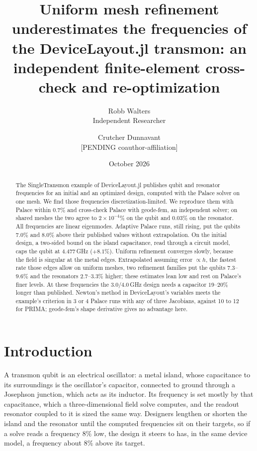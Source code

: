 \documentclass{anvil-paper}
\title{Uniform mesh refinement underestimates the frequencies of the
DeviceLayout.jl transmon: an independent finite-element cross-check and
re-optimization}
\author{Robb Walters\\
  {\normalsize Independent Researcher}
  \and Crutcher Dunnavant\\
  {\normalsize [PENDING coauthor-affiliation]}}
\date{October 2026}
\begin{document}
\maketitle

\begin{abstract}
The SingleTransmon example of DeviceLayout.jl publishes qubit and
resonator frequencies for an initial and an optimized design, computed
with the Palace solver on one mesh. We find those
frequencies discretization-limited. We reproduce them with Palace within
$0.7\%$ and cross-check Palace with geode-fem, an independent solver; on
shared meshes the two agree to $2\times10^{-4}\%$ on the qubit and
$0.03\%$ on the resonator. All frequencies are linear eigenmodes. Adaptive
Palace runs, still rising, put the qubits $7.0\%$ and $8.0\%$ above their
published values without extrapolation. On the initial design, a two-sided
bound on the island capacitance, read through a circuit model, caps the
qubit at $4.477$\,GHz ($+8.1\%$). Uniform refinement converges slowly, because the field is singular at the metal edges.
Extrapolated assuming error $\propto h$, the fastest rate those edges allow on uniform meshes, two refinement families put the qubits $7.3$--$9.6\%$ and the
resonators $2.7$--$3.3\%$ higher; these estimates lean low and rest on
Palace's finer levels. At these frequencies the $3.0$/$4.0$\,GHz
design needs a capacitor $19$--$20\%$ longer than published. Newton's
method in DeviceLayout's variables meets the example's criterion in 3 or
4 Palace runs with any of three Jacobians, against 10 to 12 for PRIMA;
geode-fem's shape derivative gives no advantage here.
\end{abstract}

\section{Introduction}
\label{sec:intro}

A transmon qubit is an electrical oscillator: a metal island, whose
capacitance to its surroundings is the oscillator's capacitor, connected
to ground through a Josephson junction, which acts as its inductor. Its
frequency is set mostly by that capacitance, which a three-dimensional
field solve computes, and the readout resonator coupled to it is sized the
same way. Designers lengthen or shorten the island and the resonator until
the computed frequencies sit on their targets, so if a solve reads a
frequency $8\%$ low, the design it steers to has, in the same device
model, a frequency about $8\%$ above its target.
\end{document}
